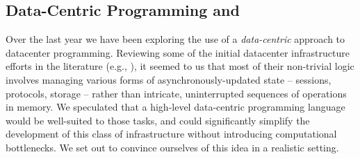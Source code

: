 \documentclass{sig-alternate}
\newcommand{\jmh}[1]{{\textcolor{red}{#1 -- jmh}}}
\begin{document}
% 
% 

\subsection{Data-Centric Programming and \BOOM}
Over the last year we have been exploring the use of a {\em data-centric} approach to datacenter programming. Reviewing some of the initial datacenter infrastructure efforts in the literature (e.g., \cite{mapreduce,gfs,chubby,dynamo}), it seemed to us that most of their non-trivial logic involves managing various forms of asynchronously-updated state -- sessions, protocols, storage -- rather than intricate, uninterrupted sequences of operations in memory.  We speculated that a high-level data-centric programming language would be well-suited to those tasks, and could significantly simplify the development of this class of infrastructure without introducing computational bottlenecks.  We set out to convince ourselves of this idea in a realistic setting.
\end{document}
